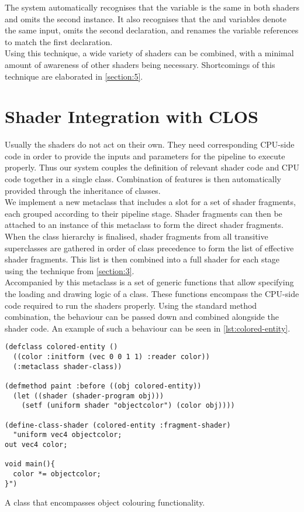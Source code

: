 \documentclass{sig-alternate}
\begin{document}
The system automatically recognises that the  variable is the same in both shaders and omits the second instance. It also recognises that the  and  variables denote the same input, omits the second declaration, and renames the variable references to match the first declaration. \\

Using this technique, a wide variety of shaders can be combined, with a minimal amount of awareness of other shaders being necessary. Shortcomings of this technique are elaborated in \autoref{section:5}.

\section{Shader Integration with CLOS}\label{section:4}
Usually the shaders do not act on their own. They need corresponding CPU-side code in order to provide the inputs and parameters for the pipeline to execute properly. Thus our system couples the definition of relevant shader code and CPU code together in a single class. Combination of features is then automatically provided through the inheritance of classes. \\

We implement a new metaclass that includes a slot for a set of shader fragments, each grouped according to their pipeline stage. Shader fragments can then be attached to an instance of this metaclass to form the direct shader fragments. When the class hierarchy is finalised, shader fragments from all transitive superclasses are gathered in order of class precedence to form the list of effective shader fragments. This list is then combined into a full shader for each stage using the technique from \autoref{section:3}. \\

Accompanied by this metaclass is a set of generic functions that allow specifying the loading and drawing logic of a class. These functions encompass the CPU-side code required to run the shaders properly. Using the standard method combination, the behaviour can be passed down and combined alongside the shader code. An example of such a behaviour can be seen in \autoref{lst:colored-entity}.\\

\begin{listing}[h]
\begin{verbatim}
(defclass colored-entity ()
  ((color :initform (vec 0 0 1 1) :reader color))
  (:metaclass shader-class))

(defmethod paint :before ((obj colored-entity))
  (let ((shader (shader-program obj)))
    (setf (uniform shader "objectcolor") (color obj))))

(define-class-shader (colored-entity :fragment-shader)
  "uniform vec4 objectcolor;
out vec4 color;

void main(){
  color *= objectcolor;
}")
\end{verbatim}
\caption{A  class that encompasses object colouring functionality.}
\label{lst:colored-entity}
\end{listing}
\end{document}
